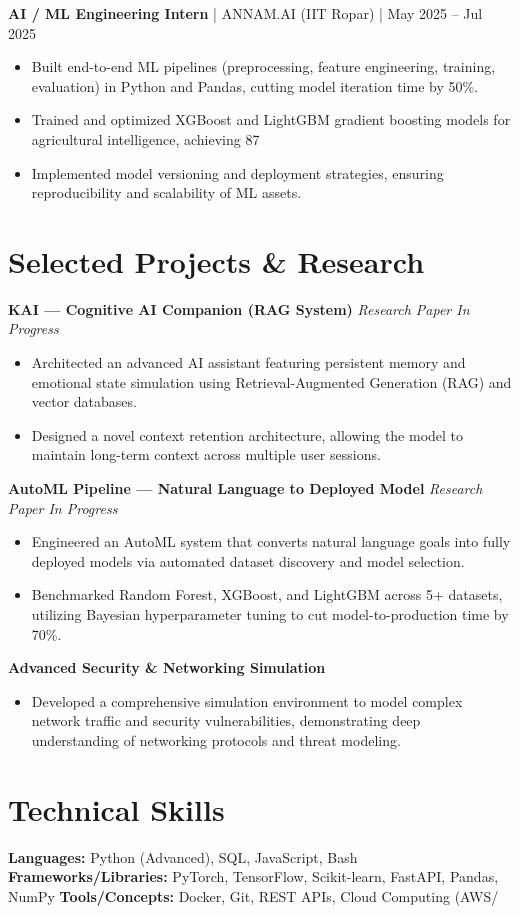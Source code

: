 \documentclass[10pt, a4paper]{article}
\begin{document}
\textbf{AI / ML Engineering Intern} | ANNAM.AI (IIT Ropar) | May 2025 – Jul 2025
\begin{itemize}[leftmargin=*, itemsep=1pt]
    \item Built end-to-end ML pipelines (preprocessing, feature engineering, training, evaluation) in Python and Pandas, cutting model iteration time by 50\%.
    \item Trained and optimized XGBoost and LightGBM gradient boosting models for agricultural intelligence, achieving 87%
    \item Implemented model versioning and deployment strategies, ensuring reproducibility and scalability of ML assets.
\end{itemize}

\section*{Selected Projects \& Research}
\textbf{KAI — Cognitive AI Companion (RAG System)} \hfill \textit{Research Paper In Progress}
\begin{itemize}[leftmargin=*, itemsep=1pt]
    \item Architected an advanced AI assistant featuring persistent memory and emotional state simulation using Retrieval-Augmented Generation (RAG) and vector databases.
    \item Designed a novel context retention architecture, allowing the model to maintain long-term context across multiple user sessions.
\end{itemize}

\textbf{AutoML Pipeline — Natural Language to Deployed Model} \hfill \textit{Research Paper In Progress}
\begin{itemize}[leftmargin=*, itemsep=1pt]
    \item Engineered an AutoML system that converts natural language goals into fully deployed models via automated dataset discovery and model selection.
    \item Benchmarked Random Forest, XGBoost, and LightGBM across 5+ datasets, utilizing Bayesian hyperparameter tuning to cut model-to-production time by 70\%.
\end{itemize}

\vspace{3pt}
\textbf{Advanced Security & Networking Simulation}
\begin{itemize}
    \item Developed a comprehensive simulation environment to model complex network traffic and security vulnerabilities, demonstrating deep understanding of networking protocols and threat modeling.
\end{itemize}


\section*{Technical Skills}
\textbf{Languages:} Python (Advanced), SQL, JavaScript, Bash
\textbf{Frameworks/Libraries:} PyTorch, TensorFlow, Scikit-learn, FastAPI, Pandas, NumPy
\textbf{Tools/Concepts:} Docker, Git, REST APIs, Cloud Computing (AWS/
\end{document}
